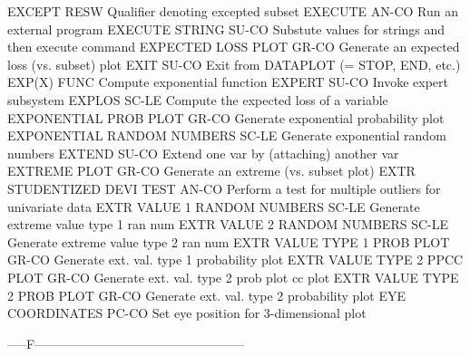 EXCEPT                      RESW  Qualifier denoting excepted subset
EXECUTE                     AN-CO Run an external program
EXECUTE STRING              SU-CO Substute values for strings and then execute command
EXPECTED LOSS PLOT          GR-CO Generate an expected loss (vs. subset) plot
EXIT                        SU-CO Exit from DATAPLOT (= STOP, END, etc.)
EXP(X)                      FUNC  Compute exponential function
EXPERT                      SU-CO Invoke expert subsystem
EXPLOS                      SC-LE Compute the expected loss of a variable
EXPONENTIAL PROB PLOT       GR-CO Generate exponential probability plot
EXPONENTIAL RANDOM NUMBERS  SC-LE Generate exponential random numbers
EXTEND                      SU-CO Extend one var by (attaching) another var
EXTREME PLOT                GR-CO Generate an extreme (vs. subset plot)
EXTR STUDENTIZED DEVI TEST  AN-CO Perform a test for multiple outliers for univariate data
EXTR VALUE 1 RANDOM NUMBERS SC-LE Generate extreme value type 1 ran num
EXTR VALUE 2 RANDOM NUMBERS SC-LE Generate extreme value type 2 ran num
EXTR VALUE TYPE 1 PROB PLOT GR-CO Generate ext. val. type 1 probability plot
EXTR VALUE TYPE 2 PPCC PLOT GR-CO Generate ext. val. type 2 prob plot cc plot
EXTR VALUE TYPE 2 PROB PLOT GR-CO Generate ext. val. type 2 probability plot
EYE COORDINATES             PC-CO Set eye position for 3-dimensional plot

-----F--------------------------------------------------

